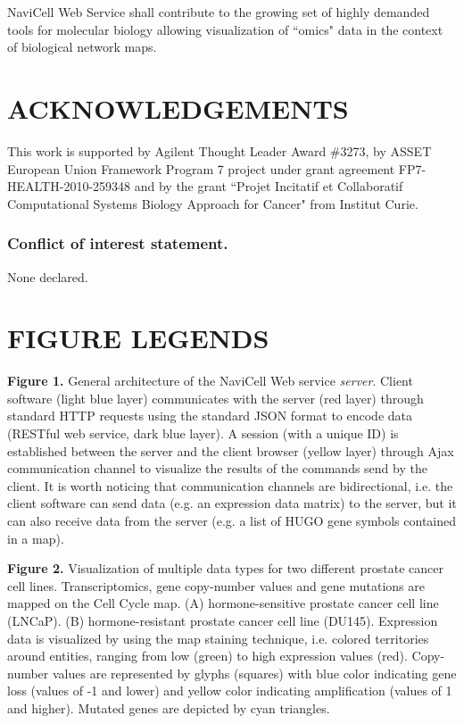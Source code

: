 \documentclass[a4,center,fleqn]{NAR}
\begin{document}
NaviCell Web Service shall contribute to the growing set of highly demanded
tools for molecular biology allowing visualization of ``omics" data in the
context of biological network maps.

\section{ACKNOWLEDGEMENTS}

This work is supported by Agilent Thought Leader Award \#3273, by ASSET European Union Framework Program 7 project under grant agreement FP7-HEALTH-2010-259348 and by the
grant ``Projet Incitatif et Collaboratif Computational Systems Biology Approach for Cancer" from Institut Curie.

\subsubsection{Conflict of interest statement.} None declared.

\section{FIGURE LEGENDS}

\textbf{Figure 1.} General architecture of the NaviCell Web service
\emph{server}. Client software (light blue layer) communicates with the server
(red layer) through standard HTTP requests using the standard JSON format to
encode data (RESTful web service, dark blue layer). A session (with a unique ID)
is established between the server and the client browser (yellow layer) through
Ajax communication channel to visualize the results of the commands send by the
client. It is worth noticing that communication channels are bidirectional, i.e.
the client software can send data (e.g. an expression data matrix) to the
server, but it can also receive data from the server (e.g. a list of HUGO
gene symbols contained in a map).

\textbf{Figure 2.} Visualization of multiple data types for two different
prostate cancer cell lines. Transcriptomics, gene copy-number values and gene
mutations \cite{barretina2012cancer} are mapped on the Cell Cycle map. (A)
hormone-sensitive prostate cancer cell line (LNCaP). (B) hormone-resistant
prostate cancer cell line (DU145). Expression data is visualized by using the
map staining technique, i.e. colored territories around entities, ranging from
low  (green) to high expression values (red).  Copy-number values are
represented by glyphs (squares) with blue color indicating gene loss (values of
-1 and lower) and yellow color indicating amplification (values of 1 and
higher). Mutated genes are depicted by cyan triangles.
\end{document}
